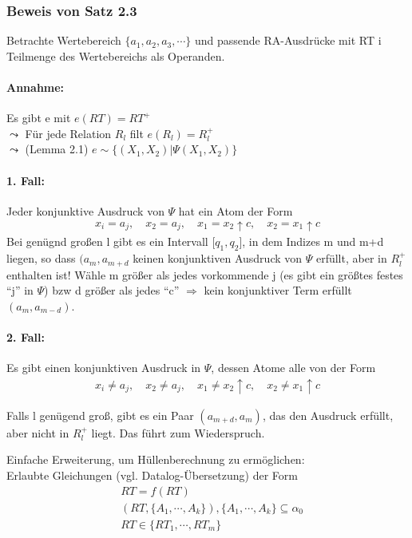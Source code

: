 \documentclass[12pt, a4paper]{article}
\begin{document}
\subsubsection*{Beweis von Satz 2.3}
Betrachte Wertebereich $\{ a_1, a_2, a_3, \cdots \}$ und passende RA-Ausdrücke mit RT i Teilmenge des Wertebereichs als Operanden. \\
\paragraph{Annahme:} Es gibt e mit $e(RT) = RT^+$ \\
$\leadsto$ Für jede Relation $R_l$ filt $e(R_l) = R_l^+$ \\
$\leadsto$ (Lemma 2.1) $e \sim \{ (X_1, X_2) | \Psi(X_1, X_2) \}$

\paragraph{1. Fall:}
Jeder konjunktive Ausdruck von $\Psi$ hat ein Atom der Form 
\begin{align*}
x_i = a_j, \quad x_2 = a_j, \quad x_1 = x_2 \uparrow c, \quad x_2 = x_1 \uparrow c
\end{align*}
Bei genügnd großen l gibt es ein Intervall [$q_1, q_2$], in dem Indizes m und m+d liegen, so dass $(a_m, a_{m+d}$ keinen konjunktiven Ausdruck von $\Psi$ erfüllt, aber in $R_l^+$ enthalten ist!
Wähle m größer als jedes vorkommende j (es gibt ein größtes festes ``j'' in $\Psi$) bzw d größer als jedes ``c'' $\Rightarrow$ kein konjunktiver Term erfüllt $(a_m, a_{m-d})$.

\paragraph{2. Fall:}
Es gibt einen konjunktiven Ausdruck in $\Psi$, dessen Atome alle von der Form
\begin{align*}
x_i \neq a_j, \quad x_2 \neq a_j, \quad x_1 \neq x_2 \uparrow c, \quad x_2 \neq x_1 \uparrow c
\end{align*}

Falls l genügend groß, gibt es ein Paar $(a_{m+d}, a_m)$, das den Ausdruck erfüllt, aber nicht in $R_l^+$ liegt. Das führt zum Wiederspruch.

Einfache Erweiterung, um Hüllenberechnung zu ermöglichen: \\
Erlaubte Gleichungen (vgl. Datalog-Übersetzung) der Form \\
\begin{align*}
&RT = f(RT) \\
&(RT, \{ A_1, \cdots, A_k \}), \{ A_1, \cdots, A_k \} \subseteq \alpha_0 \\
& RT \in \{ RT_1, \cdots, RT_m \}
\end{align*}
\end{document}
